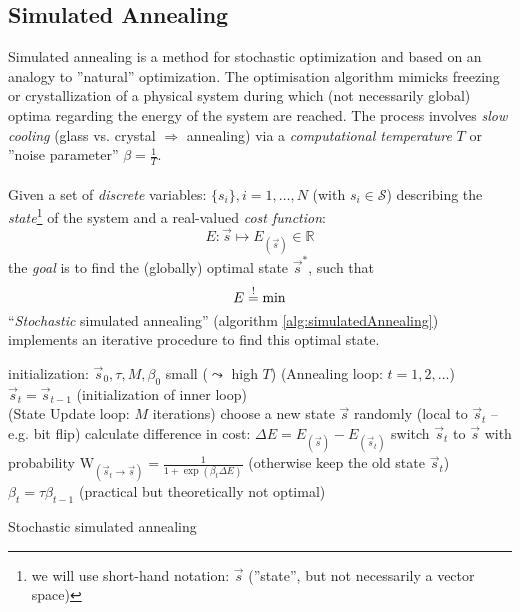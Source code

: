 \subsection{Simulated Annealing}
Simulated annealing is a method for stochastic optimization and based on an
{analogy} to ''natural'' optimization. The optimisation algorithm
mimicks freezing or crystallization of a physical system during which
(not necessarily global) optima regarding the energy of the system are reached. The process involves
\emph{slow cooling} (glass vs. crystal $\Rightarrow$ annealing) via
a \emph{computational temperature} $T$ or ''noise parameter'' $\beta =
\frac{1}{T}$.
\\\\
Given a set of \emph{discrete} variables: $\{s_i\}, i = 1, \ldots, N$ (with $s_i \in \mathcal{S}$) describing the \emph{state}\footnote{
we will use short-hand notation: $\vec{s}$ (''state'', but not necessarily a
  vector space)} of the system and a real-valued \emph{cost function}: 
\begin{equation}
	E: \vec{s} \mapsto E_{(\vec{s})} \in \mathbb{R}
\end{equation}
the \emph{goal} is to find the (globally) optimal state $\vec{s}^*$, such that 
\begin{equation}
	E \stackrel{\mathrm{!}}{=} \min 
\end{equation}
``\emph{Stochastic} simulated annealing'' (algorithm \ref{alg:simulatedAnnealing}) implements an iterative procedure to find this optimal state.
\begin{algorithm}[h]
  \DontPrintSemicolon
  initialization: $\vec{s}_0, \tau, M, \beta_0$ small ($\leadsto$ high $T$) \;
  \Begin(Annealing loop: $t=1,2,\dots$){ 
    $\vec{s}_t = \vec{s}_{t-1}$ (initialization of inner loop) \\
    \Begin(State Update loop: $M$ iterations){
      choose a new state $\vec{s}$ randomly (local to $\vec{s}_t$ -- e.g. bit flip)\;
      calculate difference in cost:  $\Delta E = E_{(\vec{s})}
      - E_{(\vec{s}_t)}$ \;
      switch $\vec{s}_t$ to $\vec{s}$ with probability $\mathrm{W}_{(\vec{s}_t \rightarrow \vec{s})} =  
      \frac{1}{1 + \exp( \beta_t \Delta E)}$\;
      (otherwise keep the old state $\vec{s}_t$) \;
      }
      $\beta_t = \tau \beta_{t-1}$  {\tiny (practical but theoretically not optimal)}
    }
    \label{alg:simulatedAnnealing}
    \caption{Stochastic simulated annealing}
  \end{algorithm}
